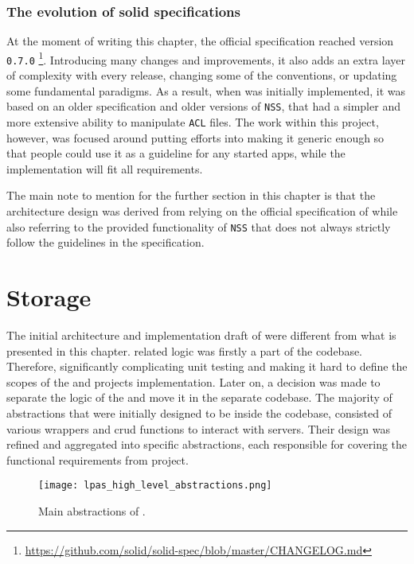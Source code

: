 \subsubsection{The evolution of solid specifications}
At the moment of writing this chapter, the official \solid{} specification reached version \texttt{0.7.0} \footnote{\url{https://github.com/solid/solid-spec/blob/master/CHANGELOG.md}}. Introducing many changes and improvements, it also adds an extra layer of complexity with every release, changing some of the conventions, or updating some fundamental paradigms. As a result, when \lpa{} was initially implemented, it was based on an older specification and older versions of \texttt{NSS}, that had a simpler and more extensive ability to manipulate \texttt{ACL} files. The work within this project, however, was focused around putting efforts into making it generic enough so that people could use it as a guideline for any started \solid{} apps, while the implementation will fit all \lpa{} requirements.

The main note to mention for the further section in this chapter is that the architecture design was derived from relying on the official specification of \solid{} while also referring to the provided functionality of \texttt{NSS} that does not always strictly follow the guidelines in the specification. 


\section{Storage}
\label{ssec:storage}

The initial architecture and implementation draft of \lpas{} were different from what is presented in this chapter.  \solid{} related logic was firstly a part of the \lpa{} codebase. Therefore, significantly complicating unit testing and making it hard to define the scopes of the \lpa{} and \lpas{} projects implementation. Later on, a decision was made to separate the logic of the \lpas{} and move it in the separate codebase. The majority of abstractions that were initially designed to be inside the \lpa{} codebase, consisted of various wrappers and crud functions to interact with \solid{} servers. Their design was refined and aggregated into specific abstractions, each responsible for covering the functional requirements from \lpa{} project.

\begin{figure}[h]
\centering
\texttt{[image: lpas\_high\_level\_abstractions.png]}
\caption{Main abstractions of \lpas.}
\label{fig:lpas_high_level_abstractions}
\end{figure}

